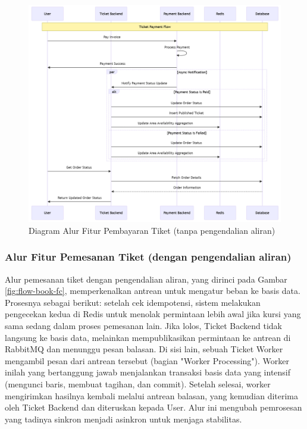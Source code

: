 \begin{figure}[H]
    \centering
    \includegraphics[width=1\textwidth]{resources/chapter-3/order-payment.png}
    \caption{Diagram Alur Fitur Pembayaran Tiket (tanpa pengendalian aliran)}
    \label{fig:flow-order-payment-flow}
\end{figure}

\pagebreak

\subsubsection{Alur Fitur Pemesanan Tiket (dengan pengendalian aliran)}

Alur pemesanan tiket dengan pengendalian aliran, yang dirinci pada Gambar \ref{fig:flow-book-fc}, memperkenalkan antrean untuk mengatur beban ke basis data. Prosesnya sebagai berikut: setelah cek idempotensi, sistem melakukan pengecekan kedua di Redis untuk menolak permintaan lebih awal jika kursi yang sama sedang dalam proses pemesanan lain. Jika lolos, Ticket Backend tidak langsung ke basis data, melainkan mempublikasikan permintaan ke antrean di RabbitMQ dan menunggu pesan balasan. Di sisi lain, sebuah Ticket Worker mengambil pesan dari antrean tersebut (bagian "Worker Processing"). Worker inilah yang bertanggung jawab menjalankan transaksi basis data yang intensif (mengunci baris, membuat tagihan, dan commit). Setelah selesai, worker mengirimkan hasilnya kembali melalui antrean balasan, yang kemudian diterima oleh Ticket Backend dan diteruskan kepada User. Alur ini mengubah pemrosesan yang tadinya sinkron menjadi asinkron untuk menjaga stabilitas.

